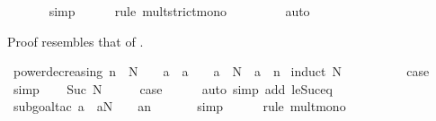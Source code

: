 \begin{isabellebody}
\ \ \ \ \ \isamarkupfalse%
\ simp\isanewline
\ \ \ \ \isamarkupfalse%
\ {\isacharparenleft}{\kern0pt}rule\ mult{\isacharunderscore}{\kern0pt}strict{\isacharunderscore}{\kern0pt}mono{\isacharparenright}{\kern0pt}\isanewline
\ \ \ \ \ \ \ \isamarkupfalse%
\ auto\isanewline
\ \ \ \ \isamarkupfalse%
\isanewline
{}\isamarkupfalse%
%
\endisatagproof
{\isafoldproof}%
%
\isadelimproof
%
\endisadelimproof
%
\begin{isamarkuptext}%
Proof resembles that of .%
\end{isamarkuptext}\isamarkuptrue%
\isamarkupfalse%
\ power{\isacharunderscore}{\kern0pt}decreasing{\isacharcolon}{\kern0pt}\ {\isachardoublequoteopen}n\ {\isasymle}\ N\ {\isasymLongrightarrow}\ {}\ {\isasymle}\ a\ {\isasymLongrightarrow}\ a\ {\isasymle}\ {}\ {\isasymLongrightarrow}\ a\ {\isacharcircum}{\kern0pt}\ N\ {\isasymle}\ a\ {\isacharcircum}{\kern0pt}\ n{\isachardoublequoteclose}\isanewline
%
\isadelimproof
%
\endisadelimproof
%
\isatagproof
{}\isamarkupfalse%
\ {\isacharparenleft}{\kern0pt}induct\ N{\isacharparenright}{\kern0pt}\isanewline
\ \ \isamarkupfalse%
\ {}\isanewline
\ \ \isamarkupfalse%
\ \isamarkupfalse%
\ {\isacharquery}{\kern0pt}case\ \isamarkupfalse%
\ simp\isanewline
{}\isamarkupfalse%
\isanewline
\ \ \isamarkupfalse%
\ {\isacharparenleft}{\kern0pt}Suc\ N{\isacharparenright}{\kern0pt}\isanewline
\ \ \isamarkupfalse%
\ \isamarkupfalse%
\ {\isacharquery}{\kern0pt}case\isanewline
\ \ \ \ \isamarkupfalse%
\ {\isacharparenleft}{\kern0pt}auto\ simp\ add{\isacharcolon}{\kern0pt}\ le{\isacharunderscore}{\kern0pt}Suc{\isacharunderscore}{\kern0pt}eq{\isacharparenright}{\kern0pt}\isanewline
\ \ \ \ \isamarkupfalse%
\ {\isacharparenleft}{\kern0pt}subgoal{\isacharunderscore}{\kern0pt}tac\ {\isachardoublequoteopen}a\ {\isacharasterisk}{\kern0pt}\ a{\isacharcircum}{\kern0pt}N\ {\isasymle}\ {}\ {\isacharasterisk}{\kern0pt}\ a{\isacharcircum}{\kern0pt}n{\isachardoublequoteclose}{\isacharparenright}{\kern0pt}\isanewline
\ \ \ \ \ \isamarkupfalse%
\ simp\isanewline
\ \ \ \ \isamarkupfalse%
\ {\isacharparenleft}{\kern0pt}rule\ mult{\isacharunderscore}{\kern0pt}mono{\isacharparenright}{\kern0pt}\isanewline

\end{isabellebody}
